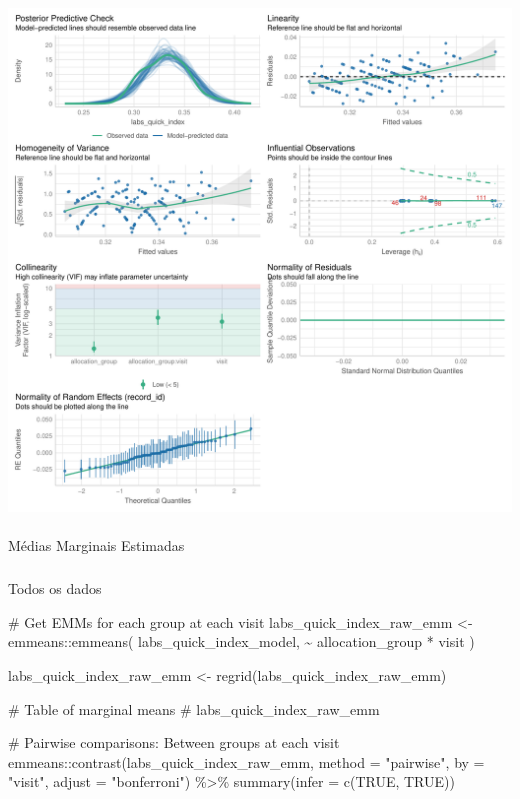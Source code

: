 \documentclass[
  12pt,
]{article}
\makeatletter
\let\oldparagraph\paragraph
\renewcommand{\paragraph}{
    \@ifstar
      \xxxParagraphStar
      \xxxParagraphNoStar
  }
\newcommand{\xxxParagraphStar}[1]{\oldparagraph*{#1}\mbox{}}
\newcommand{\xxxParagraphNoStar}[1]{\oldparagraph{#1}\mbox{}}
\let\oldsubparagraph\subparagraph
\renewcommand{\subparagraph}{
    \@ifstar
      \xxxSubParagraphStar
      \xxxSubParagraphNoStar
  }
\newcommand{\xxxSubParagraphStar}[1]{\oldsubparagraph*{#1}\mbox{}}
\newcommand{\xxxSubParagraphNoStar}[1]{\oldsubparagraph{#1}\mbox{}}
\newenvironment{Shaded}{\begin{snugshade}}{\end{snugshade}}
\newcommand{\AttributeTok}[1]{\textcolor[rgb]{0.40,0.45,0.13}{#1}}
\newcommand{\CommentTok}[1]{\textcolor[rgb]{0.37,0.37,0.37}{#1}}
\newcommand{\ConstantTok}[1]{\textcolor[rgb]{0.56,0.35,0.01}{#1}}
\newcommand{\FunctionTok}[1]{\textcolor[rgb]{0.28,0.35,0.67}{#1}}
\newcommand{\NormalTok}[1]{\textcolor[rgb]{0.00,0.23,0.31}{#1}}
\newcommand{\OtherTok}[1]{\textcolor[rgb]{0.00,0.23,0.31}{#1}}
\newcommand{\SpecialCharTok}[1]{\textcolor[rgb]{0.37,0.37,0.37}{#1}}
\newcommand{\StringTok}[1]{\textcolor[rgb]{0.13,0.47,0.30}{#1}}
\makeatother
\begin{document}
\includegraphics{Outcomes_files/figure-pdf/labs_quick_index_4-2.pdf}

\paragraph{Médias Marginais
Estimadas}\label{muxe9dias-marginais-estimadas-12}

\subparagraph{Todos os dados}\label{todos-os-dados-12}

\begin{Shaded}
\begin{Highlighting}[]
\CommentTok{\# Get EMMs for each group at each visit}
\NormalTok{labs\_quick\_index\_raw\_emm }\OtherTok{\textless{}{-}}\NormalTok{ emmeans}\SpecialCharTok{::}\FunctionTok{emmeans}\NormalTok{(}
\NormalTok{    labs\_quick\_index\_model, }
    \SpecialCharTok{\textasciitilde{}}\NormalTok{ allocation\_group }\SpecialCharTok{*}\NormalTok{ visit}
\NormalTok{)}

\NormalTok{labs\_quick\_index\_raw\_emm }\OtherTok{\textless{}{-}} \FunctionTok{regrid}\NormalTok{(labs\_quick\_index\_raw\_emm)}

\CommentTok{\# Table of marginal means}
\CommentTok{\# labs\_quick\_index\_raw\_emm}

\CommentTok{\# Pairwise comparisons: Between groups at each visit}
\NormalTok{emmeans}\SpecialCharTok{::}\FunctionTok{contrast}\NormalTok{(labs\_quick\_index\_raw\_emm,}
\AttributeTok{method =} \StringTok{"pairwise"}\NormalTok{, }\AttributeTok{by =} \StringTok{"visit"}\NormalTok{,}
\AttributeTok{adjust =} \StringTok{"bonferroni"}\NormalTok{) }\SpecialCharTok{\%\textgreater{}\%} \FunctionTok{summary}\NormalTok{(}\AttributeTok{infer =} \FunctionTok{c}\NormalTok{(}\ConstantTok{TRUE}\NormalTok{, }\ConstantTok{TRUE}\NormalTok{))}
\end{Highlighting}
\end{Shaded}
\end{document}
